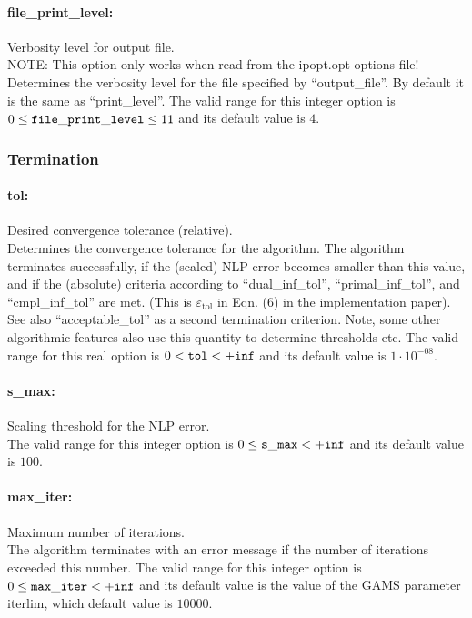 \paragraph{file\_print\_level:} Verbosity level for output file. $\;$ \\
 NOTE: This option only works when read from the
ipopt.opt options file! Determines the verbosity
level for the file specified by ``output\_file''.
By default it is the same as ``print\_level''. The valid range for this integer option is
$0 \le {\tt file\_print\_level } \le 11$
and its default value is $4$.

\subsubsection{Termination}

\paragraph{tol:} Desired convergence tolerance (relative). $\;$ \\
 Determines the convergence tolerance for the
algorithm.  The algorithm terminates
successfully, if the (scaled) NLP error becomes
smaller than this value, and if the (absolute)
criteria according to ``dual\_inf\_tol'',
``primal\_inf\_tol'', and ``cmpl\_inf\_tol'' are met.
 (This is $\varepsilon_\mathrm{tol}$ in Eqn. (6) in the
implementation paper).  See also
``acceptable\_tol'' as a second termination
criterion.  Note, some other algorithmic features
also use this quantity to determine thresholds
etc. The valid range for this real option is 
$0 <  {\tt tol } <  {\tt +inf}$
and its default value is $1 \cdot 10^{-08}$.

\paragraph{s\_max:} Scaling threshold for the NLP error. $\;$ \\
The valid range for this integer option is
$0 \le {\tt s\_max } <  {\tt +inf}$
and its default value is $100$.

\paragraph{max\_iter:} Maximum number of iterations. $\;$ \\
 The algorithm terminates with an error message if
the number of iterations exceeded this number. The valid range for this integer option is
$0 \le {\tt max\_iter } <  {\tt +inf}$
and its default value is the value of the GAMS parameter iterlim, which default value is $10000$.


